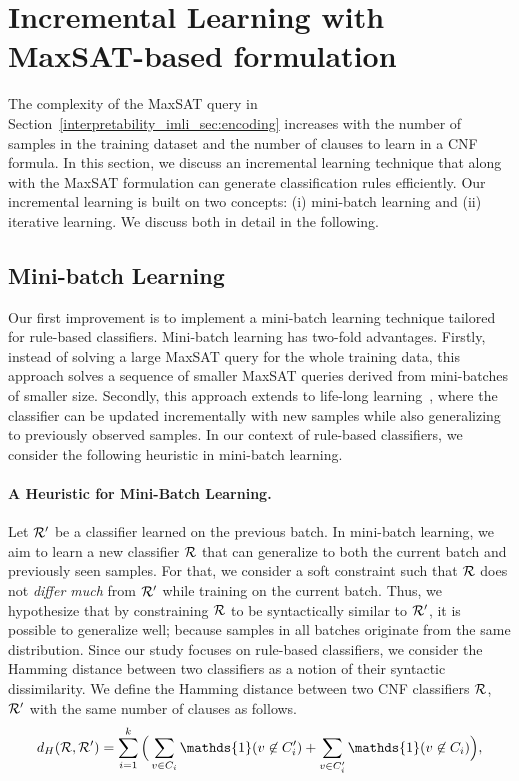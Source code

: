 \section{Incremental Learning with MaxSAT-based formulation}
\label{interpretability_imli_sec:incremental_learning}
The complexity of the MaxSAT query in Section~\ref{interpretability_imli_sec:encoding} increases with the number of samples in the training dataset and the number of clauses to learn in a CNF formula. In this section, we discuss an incremental learning technique that along with the MaxSAT formulation can generate classification rules efficiently. Our incremental learning is built on two concepts: (i)
mini-batch learning and (ii) iterative learning. We discuss both in detail in the following.

\subsection{Mini-batch Learning} 

Our first improvement is to implement a mini-batch learning technique tailored for rule-based classifiers. Mini-batch learning has two-fold advantages. Firstly, instead of solving a large MaxSAT query for the whole training data, this approach solves a sequence of smaller MaxSAT queries derived from mini-batches of smaller size.  Secondly, this approach extends to life-long learning~\cite{chen2018lifelong}, where the classifier can be updated incrementally with new samples while also generalizing to previously observed samples. In our context of rule-based classifiers, we consider the following heuristic in mini-batch learning.


\paragraph{A Heuristic for Mini-Batch Learning.} Let $ {\mathcal{R}}' $ be a classifier learned on the previous batch. In mini-batch learning, we aim to learn a new classifier $ {\mathcal{R}} $ that can generalize to both the current batch and previously seen samples. For that, we consider a soft constraint such that $ {\mathcal{R}} $ does not \emph{differ much} from $ {\mathcal{R}}' $ while training on the current batch. Thus, we hypothesize that by constraining $ {\mathcal{R}} $ to be syntactically similar to $ {\mathcal{R}}' $, it is possible to generalize well; because samples in all batches originate from the same distribution. Since our study focuses on rule-based classifiers, we consider the Hamming distance between two classifiers as a notion of their syntactic dissimilarity. We define the Hamming distance between two CNF classifiers $ {\mathcal{R}} $, $ {\mathcal{R}}' $ with the same number of clauses as follows.
\[
	d_{H}(\Rule, \Rule') = \sum_{i=1}^k \Big(\sum_{v\in C_i} \mathds{1}(v \not\in C'_i) +  \sum_{v\in C'_i} \mathds{1}(v \not\in C_i) \Big), 
\]
 
